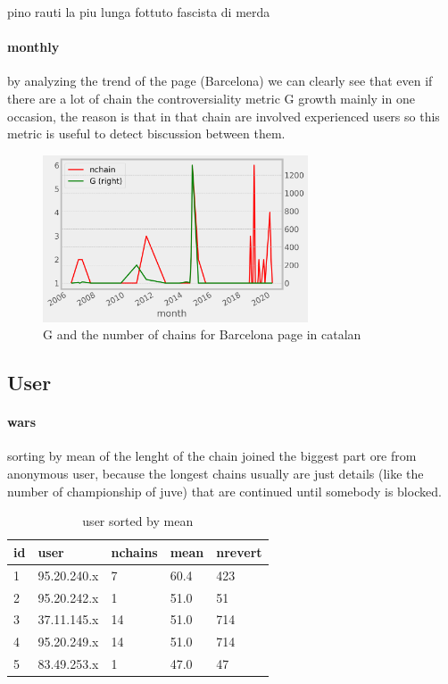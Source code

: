 pino rauti la piu lunga fottuto fascista di merda 

\paragraph*{monthly}
by analyzing the trend of the page (Barcelona) we can clearly see that even if there are a lot of chain
the controversiality metric G growth mainly in one occasion, the reason is that in that chain are
involved experienced users  so this metric is useful to detect biscussion between them.
\begin{figure}[H]
    \centering
    \includegraphics[width=0.7\textwidth]{./chapters/04/assets/chains_page.png}
    \caption{G and the number of chains for Barcelona page  in catalan}
    \label{fig:chainsuser}
\end{figure}

\subsection{User}
\paragraph*{wars}
sorting by mean of the lenght of the chain joined the biggest part ore from anonymous user, because
the longest chains usually are just details (like the number of championship of juve) that are
continued until somebody is blocked.

\begin{table}[H]
    \centering
    \begin{tabularx}{\columnwidth}{@{}Xllll@{}}
        \midrule
        \textbf{id}& \textbf{user} & \textbf{nchains} & \textbf{mean}& \textbf{nrevert}  \\ \toprule
        1 & 95.20.240.x & 7  & 60.4 & 423 \\
        2 & 95.20.242.x & 1  & 51.0 & 51  \\
        3 & 37.11.145.x & 14  & 51.0 & 714  \\
        4 & 95.20.249.x & 14  & 51.0 & 714  \\
        5 & 83.49.253.x & 1  & 47.0 & 47 \\
        
         \bottomrule
    \end{tabularx}
    
    \caption{user sorted by mean \label{table:mean}}
\end{table}

